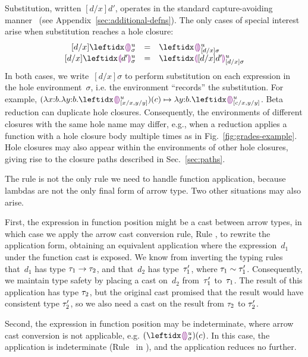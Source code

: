 


Substitution, written $[d/x]d'$, operates in the standard capture-avoiding manner~\cite{pfpl} (see Appendix~\ref{sec:additional-defns}).
%
The only cases of special interest arise when substitution reaches a hole closure:
\[
\begin{array}{rcl}
  [d/x]\dehole{u}{\sigma}{} & = & \dehole{u}{[d/x]\sigma}{} \\%
  \substitute{d}{x}{\dhole{d'}{u}{\sigma}{}} & = & \dhole{[d/x]d'}{u}{[d/x]\sigma}{}
\end{array}
\]
In both cases, we write~$[d/x]\sigma$ to perform substitution on each expression in the hole environment~$\sigma$, i.e. the environment ``records'' the substitution.
%
For example, $\stepsToD{}
    {\hap{(\halam{x}{b}{\halam{y}{b}{\dehole{u}{[x/x, y/y]}{}}})}{c}}
    {\halam{y}{b}{\dehole{u}{[c/x, y/y]}{}}}$.
%
Beta reduction can duplicate hole closures.
%
Consequently, the environments of different closures with the same hole name may differ,
e.g., when a reduction applies a function with a hole closure body multiple times as in Fig.~\ref{fig:grades-example}.
Hole closures may also appear within the environments of other hole
closures, giving rise to the closure paths described in
Sec.~\ref{sec:paths}.



The  rule is not the only rule we need to handle function
application, because lambdas are not the only final form of arrow type.
%
Two other situations may also arise.

First, the expression in function position might be a cast between
arrow types, in which case we apply the arrow cast conversion rule,
Rule , to rewrite the application form, obtaining an
equivalent application where the expression~$d_1$ under the function
cast is exposed.
%
We know from inverting the typing rules that~$d_1$ has type
$\tau_1 \rightarrow \tau_2$, and that~$d_2$ has type~$\tau_1'$, where
$\tau_1 \sim \tau_1'$.
Consequently, we maintain type
safety by placing a cast on~$d_2$ from~$\tau_1'$ to~$\tau_1$.
%
The result of this application has type $\tau_2$, but the
original cast promised that the result would have consistent type
$\tau_2'$, so we also need a cast on the result from $\tau_2$ to
$\tau_2'$.

Second, the expression in function position may be indeterminate,
where arrow cast conversion is not applicable,
e.g. $\hap{(\dehole{u}{\sigma}{})}{c}$.
%
In this case, the application is indeterminate (Rule~
in ), and the application reduces no
further.

